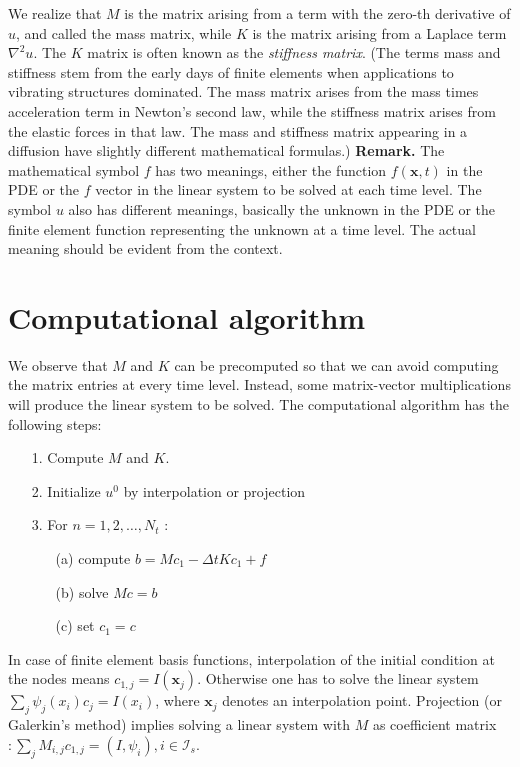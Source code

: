 \documentclass[../main.tex]{subfiles}
\begin{document}
		\noindent We realize that $M$ is the matrix arising from a term with the zero-th derivative of $u$, and called the mass matrix, while $K$ is the matrix arising from a Laplace term $\nabla^{2} u$. The $K$ matrix is often known as the \emph{stiffness matrix}. (The terms mass and stiffness stem from the early days of finite elements when applications to vibrating structures dominated. The mass matrix arises from the mass times acceleration term in Newton's second law, while the stiffness matrix arises from the elastic forces in that law. The mass and stiffness matrix appearing in a diffusion have slightly different mathematical formulas.)\smallbreak
		\noindent \textbf{Remark.   } The mathematical symbol $f$ has two meanings, either the function $f(\boldsymbol{x}, t)$ in the PDE or the $f$ vector in the linear system to be solved at each time level. The symbol $u$ also has different meanings, basically the unknown in the PDE or the finite element function representing the unknown at a time level. The actual meaning should be evident from the context.
		
	\section[Computational algorithm]{Computational algorithm}
		\label{sec:sec_19_5}
		\noindent We observe that $M$ and $K$ can be precomputed so that we can avoid computing the matrix entries at every time level. Instead, some matrix-vector multiplications will produce the linear system to be solved. The computational algorithm has the following steps:

		\begin{enumerate}
		\item [1.] Compute $M$ and $K$.
		\item [2.] Initialize $u^{0}$ by interpolation or projection
		\item [3.] For $n=1,2, \ldots, N_{t}$ :
			\begin{enumerate}
				\item[(a)] compute $b=M c_{1}-\Delta t K c_{1}+f$
				\item[(b)] solve $M c=b$
				\item[(c)] set $c_{1}=c$
			\end{enumerate}
		\end{enumerate}
	
		\noindent In case of finite element basis functions, interpolation of the initial condition at the nodes means $c_{1, j}=I\left(\boldsymbol{x}_{j}\right)$. Otherwise one has to solve the linear system $\sum_{j} \psi_{j}\left(x_{i}\right) c_{j}=I\left(x_{i}\right)$, where $\boldsymbol{x}_{j}$ denotes an interpolation point. Projection (or Galerkin's method) implies solving a linear system with $M$ as coefficient matrix $: \sum_{j} M_{i, j} c_{1, j}=\left(I, \psi_{i}\right), i \in \mathcal{I}_{s}$.
		
\end{document}
